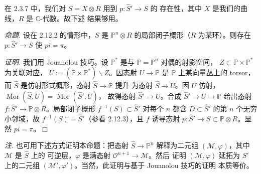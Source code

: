 在 2.3.7 中，我们对 $S=X\otimes R$ 用到 $p:\widehat{S}'\to S$ 的
存在性，其中 $X$ 是我们的曲线，$R$ 是 $\mathbb{C}$-代数。故下述
结果够用。

 \emph{命题.} 设在 2.12.2 的情形中，$S$ 是
$\mathbb{P}^{n}\otimes R$ 的局部闭子概形（$R$ 为某环）。则存在
$p:\widehat{S}'\to S$ 使 $pi=\pi$。

\emph{证明.} 我们用 Jouanolou 技巧。设 $\mathbb{P}^{*}$ 是与
$\mathbb{P}=\mathbb{P}^{n}$ 对偶的射影空间，
$Z\subset\mathbb{P}\times\mathbb{P}^{*}$ 为关联对应，
$U:=(\mathbb{P}\times\mathbb{P}^{*})\backslash Z$。因态射
$U\to\mathbb{P}$ 是 $\mathbb{P}$ 上某向量丛上的 torsor，而
$\widehat{S}$ 是仿射形式概形，态射 $\widehat{S}\to\mathbb{P}$ 提升
为态射 $\widehat{S}\to U$。因 $U$ 仿射，
$\operatorname{Mor}(\widehat{S},U)=\operatorname{Mor}(\widehat{S}',U)$，
故得态射 $\widehat{S}'\to U$。合成
$\widehat{S}'\to U\to\mathbb{P}$ 给出态射
$f:\widehat{S}'\to\mathbb{P}\otimes R$。局部闭子概形
$f^{-1}(S)\subset\widehat{S}'$ 对每个 $n$ 都含
$D\subset\widehat{S}'$ 的第 $n$ 个无穷小邻域，故
$f^{-1}(S)=\widehat{S}'$（参看 2.12.3），且 $f$ 诱导态射
$p:\widehat{S}'\to S\subset\mathbb{P}\otimes R$。显然
$pi=\pi$。\hfill$\Box$

\emph{注.} 也可用下述方式证明本命题：把态射
$\widehat{S}\to\mathbb{P}^{n}$ 解释为二元组
$(\mathcal{M},\varphi)$，其中 $\mathcal{M}$ 是 $\widehat{S}$ 上的
可逆层，$\varphi$ 是满态射 $\mathcal{O}^{n+1}\to\mathcal{M}$。然后
证明 $(\mathcal{M},\varphi)$ 延拓为 $\widehat{S}'$ 上的二元组
$(\mathcal{M}',\varphi')$。当然，此证明与基于 Jouanolou 技巧的证明
本质等价。
